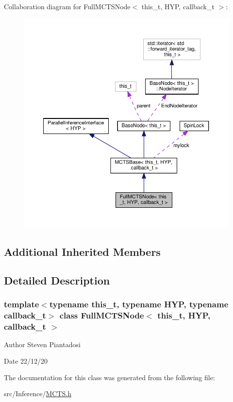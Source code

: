 Collaboration diagram for Full\+M\+C\+T\+S\+Node$<$ this\+\_\+t, H\+YP, callback\+\_\+t $>$\+:
\nopagebreak
\begin{figure}[H]
\begin{center}
\leavevmode
\includegraphics[width=350pt]{class_full_m_c_t_s_node__coll__graph}
\end{center}
\end{figure}
\subsection*{Additional Inherited Members}


\subsection{Detailed Description}
\subsubsection*{template$<$typename this\+\_\+t, typename H\+YP, typename callback\+\_\+t$>$\newline
class Full\+M\+C\+T\+S\+Node$<$ this\+\_\+t, H\+Y\+P, callback\+\_\+t $>$}

\begin{DoxyAuthor}{Author}
Steven Piantadosi 
\end{DoxyAuthor}
\begin{DoxyDate}{Date}
22/12/20 
\end{DoxyDate}


The documentation for this class was generated from the following file\+:\begin{DoxyCompactItemize}
\item 
src/\+Inference/\hyperlink{_m_c_t_s_8h}{M\+C\+T\+S.\+h}\end{DoxyCompactItemize}
